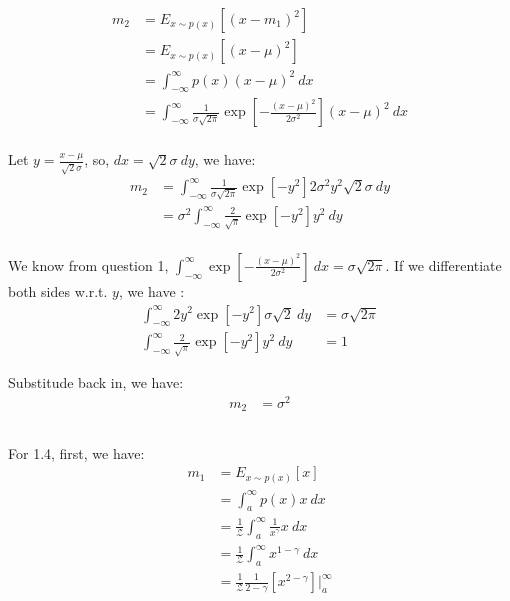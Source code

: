 \begin{align*}
    m_2 &= E_{x \sim p(x)}[(x-m_1)^2] \\
    &= E_{x \sim p(x)}[(x-\mu)^2] \\
    &= \int_{-\infty}^{\infty} p(x) (x-\mu)^2 \ dx \\
    &= \int_{-\infty}^{\infty} \frac{1}{\sigma \sqrt{2 \pi}} \exp[-\frac{(x-\mu)^2}{2 \sigma^2}] (x-\mu)^2 \ dx \\
\end{align*}

Let $y=\frac{x-\mu}{\sqrt{2}\sigma}$, so, $dx = \sqrt{2} \sigma\ dy$, we have:
\begin{align*}
    m_2 &= 
    \int_{-\infty}^{\infty} \frac{1}{\sigma \sqrt{2 \pi}} \exp[-y^2] 2\sigma^2 y^2  \sqrt{2} \sigma \ dy \\
    &= \sigma^2 \int_{-\infty}^{\infty} \frac{2}{\sqrt{\pi}} \exp[-y^2]  y^2  \ dy \\
\end{align*}

We know from question 1, $\int_{-\infty}^{\infty} \exp[-\frac{(x-\mu)^2}{2\sigma^2}] \ dx = \sigma \sqrt{2 \pi}$.
If we differentiate both sides w.r.t. $y$, we have :
\begin{align*}
    \int_{-\infty}^{\infty} 2 y^2 \exp[-y^2] \sigma \sqrt{2} \ dy &= \sigma \sqrt{2 \pi} \\
    \int_{-\infty}^{\infty} \frac{2}{\sqrt{\pi}} \exp[-y^2]  y^2  \ dy &= 1
\end{align*}

Substitude back in, we have:
\begin{align*}
    m_2 &= \sigma^2
\end{align*}

\subsection{}
For 1.4, first, we have:
\begin{align*}
    m_1 &= E_{x \sim p(x)}[x] \\
    &= \int_{a}^{\infty} p(x) x \ dx \\
    &= \frac{1}{\mathcal{Z}} \int_{a}^{\infty} \frac{1}{x^\gamma} x \ dx \\
    &= \frac{1}{\mathcal{Z}} \int_{a}^{\infty} x^{1-\gamma} \ dx \\
    &= \frac{1}{\mathcal{Z}} \frac{1}{2-\gamma} [x^{2-\gamma}] \biggr\rvert_a^{\infty} \\
\end{align*}

